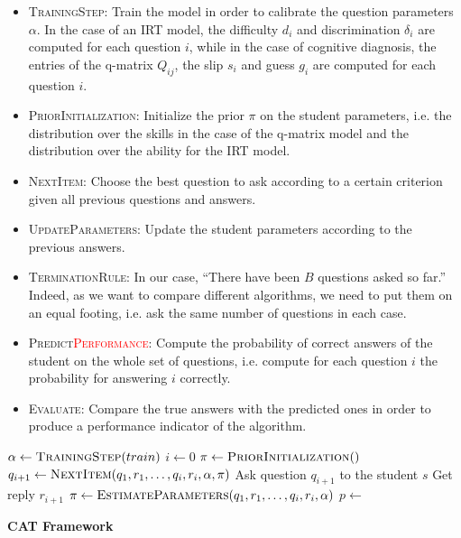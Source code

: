 \documentclass{sig-alternate}
\newcommand\alert[1]{\textcolor{red}{#1}}
\begin{document}
\begin{itemize}
\item \textsc{TrainingStep}: Train the model in order to calibrate the question parameters $\alpha$. In the case of an IRT model, the difficulty $d_i$ and discrimination $\delta_i$ are computed for each question $i$, while in the case of cognitive diagnosis, the entries of the q-matrix $Q_{ij}$, the slip $s_i$ and guess $g_i$ are computed for each question $i$.
\item \textsc{PriorInitialization}: Initialize the prior $\pi$ on the student parameters, i.e. the distribution over the skills in the case of the q-matrix model and the distribution over the ability for the IRT model. 
\item \textsc{NextItem}: Choose the best question to ask according to a certain criterion given all previous questions and answers. 
\item \textsc{UpdateParameters}: Update the student parameters according to the previous answers.
\item \textsc{TerminationRule}: In our case, ``There have been $B$ questions asked so far.'' Indeed, as we want to compare different algorithms, we need to put them on an equal footing, i.e. ask the same number of questions in each case.
\item \textsc{Predict\alert{Performance}}: Compute the probability of correct answers of the student on the whole set of questions, i.e. compute for each question $i$ the probability for answering $i$ correctly.
\item \textsc{Evaluate}: Compare the true answers with the predicted ones in order to produce a performance indicator of the algorithm. 
\end{itemize}

\begin{algorithm}
\begin{algorithmic}
\State $\alpha \gets \Call{TrainingStep}{train}$
\State $i \gets 0$
	\State $\pi \gets \Call{PriorInitialization}$
		\State $q_{i + 1} \gets \Call{NextItem}{q_1, r_1, \ldots, q_i, r_i, \alpha, \pi}$
		\State Ask question $q_{i + 1}$ to the student $s$
		\State Get reply $r_{i + 1}$
		\State $\pi \gets \Call{EstimateParameters}{q_1, r_1, \ldots, q_i, r_i, \alpha}$
		\State $p \gets$ 
		\State {}
	\EndWhile
\EndFor
\EndProcedure
\end{algorithmic}
\caption{\textbf{CAT Framework}}
\label{algo}
\end{algorithm}
\end{document}
